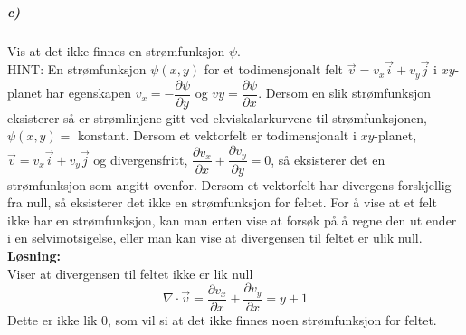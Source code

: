 \documentclass[11pt, A4paper,norsk]{article}
\begin{document}
			\subparagraph{c)}
				\begin{flushleft}
Vis at det ikke finnes en strømfunksjon $\psi$. \\
HINT: En strømfunksjon $\psi(x, y)$ for et todimensjonalt felt $\vec{v} = v_x\vec{i} + v_y \vec{j}$ i $xy$-planet har egenskapen $v_x = -\dfrac{\partial \psi}{\partial y}$ og $vy = \dfrac{\partial \psi}{\partial x}$. Dersom en slik strømfunksjon eksisterer så er strømlinjene gitt ved ekviskalarkurvene til strømfunksjonen, $\psi(x, y) =$ konstant.
Dersom et vektorfelt er todimensjonalt i $xy$-planet, $\vec{v} = v_x\vec{i} + v_y\vec{j}$ og divergensfritt, $\dfrac{\partial v_x}{\partial x} + \dfrac{\partial v_y}{\partial y} = 0$, så eksisterer det en strømfunksjon som angitt ovenfor. Dersom et vektorfelt har divergens forskjellig fra null, så eksisterer det ikke en strømfunksjon for feltet. For å vise at et felt ikke har en strømfunksjon, kan man enten vise at forsøk på å regne den ut ender i en selvimotsigelse, eller man kan vise at divergensen til feltet er ulik null. \\
\vspace{1mm}
\textbf{Løsning:} \\
\vspace{1mm}
Viser at divergensen til feltet ikke er lik null $$\nabla \cdot \vec{v} = \frac{\partial v_x}{\partial x} + \frac{\partial v_y}{\partial x} = y + 1 $$ Dette er ikke lik $0$, som vil si at det ikke finnes noen strømfunksjon for feltet.
			\end{flushleft}
\end{document}
